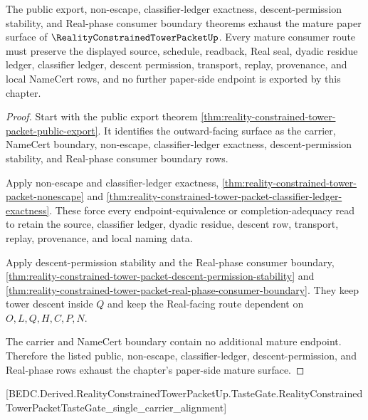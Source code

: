 \begin{theorem}
\label{thm:reality-constrained-tower-packet-mature-boundary}
The public export, non-escape, classifier-ledger exactness, descent-permission stability, and Real-phase consumer boundary theorems exhaust the mature paper surface of $\RealityConstrainedTowerPacketUp$. Every mature consumer route must preserve the displayed source, schedule, readback, Real seal, dyadic residue ledger, classifier ledger, descent permission, transport, replay, provenance, and local NameCert rows, and no further paper-side endpoint is exported by this chapter.
\end{theorem}
\begin{proof}
Start with the public export theorem \autoref{thm:reality-constrained-tower-packet-public-export}. It identifies the outward-facing surface as the carrier, NameCert boundary, non-escape, classifier-ledger exactness, descent-permission stability, and Real-phase consumer boundary rows.

Apply non-escape and classifier-ledger exactness, \autoref{thm:reality-constrained-tower-packet-nonescape} and \autoref{thm:reality-constrained-tower-packet-classifier-ledger-exactness}. These force every endpoint-equivalence or completion-adequacy read to retain the source, classifier ledger, dyadic residue, descent row, transport, replay, provenance, and local naming data.

Apply descent-permission stability and the Real-phase consumer boundary, \autoref{thm:reality-constrained-tower-packet-descent-permission-stability} and \autoref{thm:reality-constrained-tower-packet-real-phase-consumer-boundary}. They keep tower descent inside $Q$ and keep the Real-facing route dependent on $O,L,Q,H,C,P,N$.

The carrier and NameCert boundary contain no additional mature endpoint. Therefore the listed public, non-escape, classifier-ledger, descent-permission, and Real-phase rows exhaust the chapter's paper-side mature surface.
\end{proof}

[BEDC.Derived.RealityConstrainedTowerPacketUp.TasteGate.RealityConstrainedTowerPacketTasteGate\_single\_carrier\_alignment]

